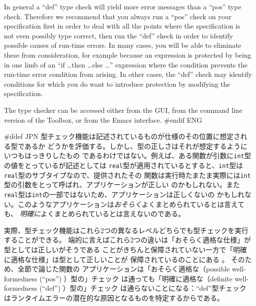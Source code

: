 \documentclass[\pformat,12pt]{article}
\newcommand{\Toolbox}{Toolbox}
\newcommand{\Toolbox}{Toolbox}
\newcommand{\aaa}{\tt }
\begin{document}
In general a ``def'' type check will yield more error messages than
a ``pos'' type check. Therefore we recommend that you always run a ``pos''
check on your specification first in order to deal with all the points
where the specification is not even possibly type correct, then run the ``def''
check in order to identify possible causes of run-time errors. In many
cases, you will be able to eliminate these from consideration, for
example because an expression is protected by being in one limb of an
``if \ldots then \ldots else \ldots'' expression where the condition
prevents the run-time error condition from arising. In other cases,
the ``def'' check may identify conditions for which you do want to
introduce protection  by modifying the specification.

The type checker can be accessed either from the GUI, from the command
line version of the \Toolbox, or from the Emacs interface.
#endif ENG
  
#ifdef JPN
型チェック機能は記述されているものが仕様のその位置に想定される型であるか
どうかを評価する。しかし、型の正しさはそれが想定するようにいつもはっきりしたもの
であるわけではない。例えば、ある関数が引数に{\aaa int}型の値をとっているが記述としては
{\aaa real}型が適用されているとすると、{\aaa int}型は{\aaa real}型のサブタイプなので、提供されたその
関数は実行時たまたま実際には{\aaa int}型の引数をとって呼ばれ、アプリケーションが正しい
のかもしれない。また{\aaa real}型は{\aaa int}の一部ではないため、アプリケーションは正しくないの
かもしれない。このようなアプリケーションは{\em おそらく\/}よくまとめられているとは言えても、
{\em 明確に\/}よくまとめられているとは言えないのである。

実際、型チェック機能はこれら2つの異なるレベルどちらでも型チェックを実行することができる。
端的に言えばこれら2つの違いは「おそらく適格な仕様」が型としては正しいがそうである
ことがきちんと保障されていない一方で「明確に適格な仕様」は型として正しいことが
保障されているのことにある
。
そのため、全節で論じた関数の
アプリケーションは「おそらく適格な（possible well-formedness (``pos'') ）型の」チェック 
は通っても「明確に適格な（definite well-formedness (``def'') ）型の」チェック 
は通らないことになる：``def''型チェックはランタイムエラーの潜在的な原因となるものを特定するからである。
\end{document}
